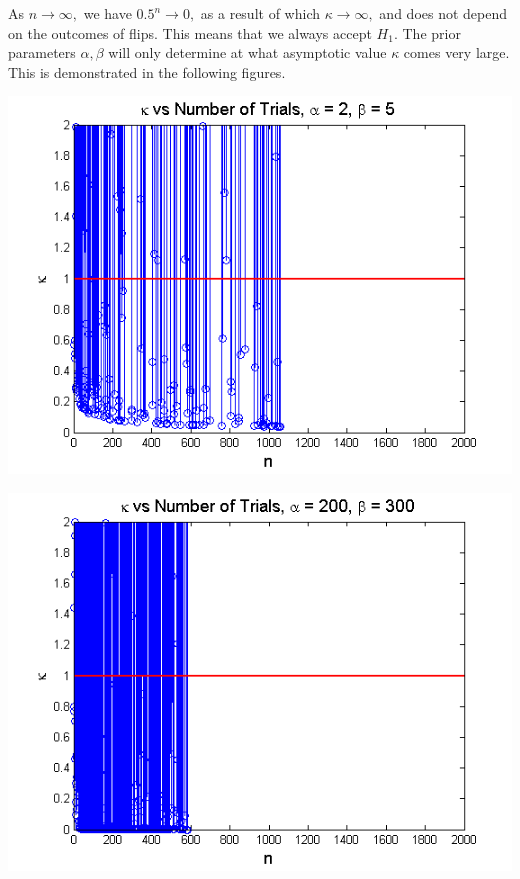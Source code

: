 \documentclass{article}
\begin{document}
\indent As $n \rightarrow \infty,$ we have $0.5^n \rightarrow 0,$ as a result of which $\kappa \rightarrow \infty,$ and does not depend on the outcomes of flips. This means that we always accept $H_1.$ The prior parameters $\alpha,\beta$ will only determine at what asymptotic value $\kappa$ comes very large. This is demonstrated in the following figures.\\

\begin{left}
\includegraphics[scale=0.5]{KvsA2B5.png}
\end{left}
\begin{right}
\includegraphics[scale=0.5]{KvsA200B300.png}\\
\end{right}
\end{document}
